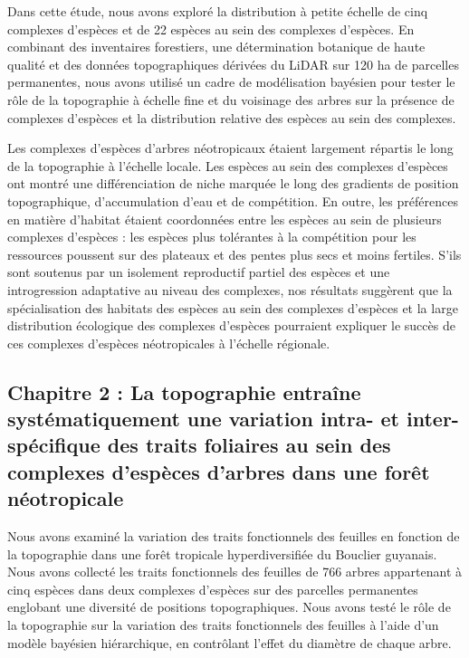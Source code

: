 \documentclass[12pt,twoside,a4paper, a]{article}
\begin{document}
Dans cette étude, nous avons exploré la distribution à petite échelle de cinq complexes d'espèces et de 22 espèces au sein des complexes d'espèces. En combinant des inventaires forestiers, une détermination botanique de haute qualité et des données topographiques dérivées du LiDAR sur 120 ha de parcelles permanentes, nous avons utilisé un cadre de modélisation bayésien pour tester le rôle de la topographie à échelle fine et du voisinage des arbres sur la présence de complexes d'espèces et la distribution relative des espèces au sein des complexes.

Les complexes d'espèces d'arbres néotropicaux étaient largement répartis le long de la topographie à l'échelle locale. Les espèces au sein des complexes d'espèces ont montré une différenciation de niche marquée le long des gradients de position topographique, d'accumulation d'eau et de compétition. En outre, les préférences en matière d'habitat étaient coordonnées entre les espèces au sein de plusieurs complexes d'espèces : les espèces plus tolérantes à la compétition pour les ressources poussent sur des plateaux et des pentes plus secs et moins fertiles. S'ils sont soutenus par un isolement reproductif partiel des espèces et une introgression adaptative au niveau des complexes, nos résultats suggèrent que la spécialisation des habitats des espèces au sein des complexes d'espèces et la large distribution écologique des complexes d'espèces pourraient expliquer le succès de ces complexes d'espèces néotropicales à l'échelle régionale.

\hypertarget{chapitre-2-la-topographie-entrauxeene-systuxe9matiquement-une-variation-intra--et-inter-spuxe9cifique-des-traits-foliaires-au-sein-des-complexes-despuxe8ces-darbres-dans-une-foruxeat-nuxe9otropicale}{%
\subsection{Chapitre 2 : La topographie entraîne systématiquement une variation intra- et inter-spécifique des traits foliaires au sein des complexes d'espèces d'arbres dans une forêt néotropicale}\label{chapitre-2-la-topographie-entrauxeene-systuxe9matiquement-une-variation-intra--et-inter-spuxe9cifique-des-traits-foliaires-au-sein-des-complexes-despuxe8ces-darbres-dans-une-foruxeat-nuxe9otropicale}}

Nous avons examiné la variation des traits fonctionnels des feuilles en fonction de la topographie dans une forêt tropicale hyperdiversifiée du Bouclier guyanais. Nous avons collecté les traits fonctionnels des feuilles de 766 arbres appartenant à cinq espèces dans deux complexes d'espèces sur des parcelles permanentes englobant une diversité de positions topographiques. Nous avons testé le rôle de la topographie sur la variation des traits fonctionnels des feuilles à l'aide d'un modèle bayésien hiérarchique, en contrôlant l'effet du diamètre de chaque arbre.
\end{document}
